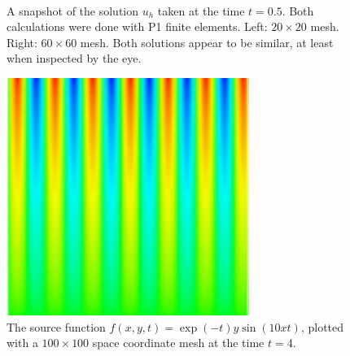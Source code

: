 \documentclass[twoside]{article}
\begin{document}
\begin{figure}
  \centering
  \mbox{
    \quad
  }
  \centering
  \caption{A snapshot of the solution $u_{h}$ taken at the time $t = 0.5$. Both calculations were done with P1 finite elements. Left: $20 \times 20$ mesh. Right: $60 \times 60$ mesh. Both solutions appear to be similar, at least when inspected by the eye.} \label{fig:t5}
\end{figure}

\begin{figure} 
  \centering
  \includegraphics[scale=0.6]{figures/f_expxsinxt_100x100/f_expsinxt_100x100.pdf}
  \caption{The source function $f(x, y, t) = \exp(-t)y\sin(10xt)$, plotted with a $100 \times 100$ space coordinate mesh at the time $t = 4$.} \label{fig:f_t4}
\end{figure}
\end{document}
